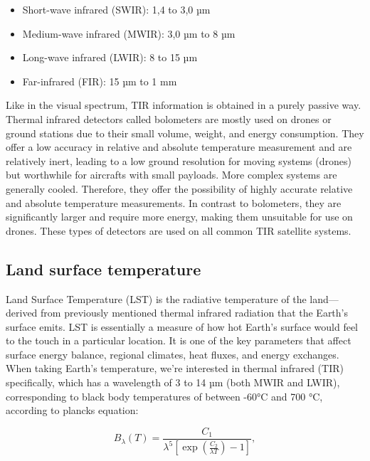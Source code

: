     \begin{itemize}
        \item  Short-wave infrared (SWIR): 1,4 to 3,0 µm
        \item  Medium-wave infrared (MWIR): 3,0 µm to 8 µm
        \item Long-wave infrared (LWIR): 8 to 15 µm
        \item Far-infrared (FIR): 15 µm to 1 mm
    \end{itemize}
    
    Like in the visual spectrum, TIR information is obtained in a purely passive way.
    Thermal infrared detectors called bolometers are mostly used on drones or ground stations due to their small volume, weight, and energy consumption. 
    They offer a low accuracy in relative and absolute temperature measurement and are relatively inert, leading to a low ground resolution for moving systems (drones) but worthwhile for aircrafts with small payloads.     
    More complex systems are generally cooled. Therefore, they offer the possibility of highly accurate relative and absolute temperature measurements.
    In contrast to bolometers, they are significantly larger and require more energy, making them unsuitable for use on drones.
    These types of detectors are used on all common TIR satellite systems.

    \subsection{Land surface temperature}

        Land Surface Temperature (LST) is the radiative temperature of the land—derived from previously mentioned thermal infrared radiation that the Earth’s surface emits.
        LST is essentially a measure of how hot Earth's surface would feel to the touch in a particular location.
        It is one of the key parameters that affect surface energy balance, regional climates, heat fluxes, and energy exchanges.
        When taking Earth’s temperature, we’re interested in thermal infrared (TIR) specifically, which has a wavelength of 3 to 14 µm (both MWIR and LWIR), corresponding to black body temperatures of between -60°C and 700 °C, according to plancks equation:
        
        \begin{equation}
            B_{\lambda}(T) = \frac{C_1}{\lambda^5 \left[ \exp\left(\frac{C_2}{\lambda T}\right) - 1\right]},
        \end{equation}
        
